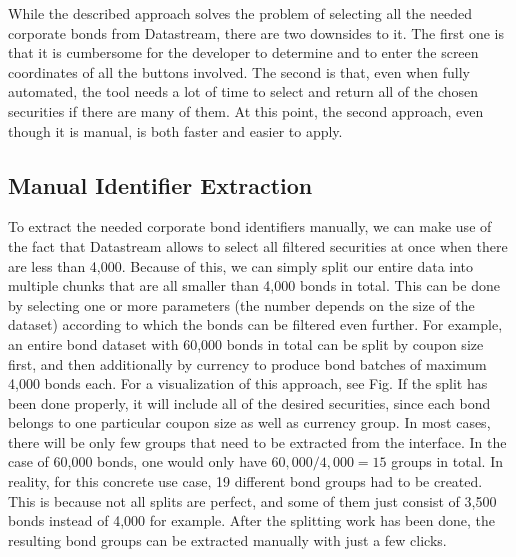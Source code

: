 While the described approach solves the problem of selecting all the needed corporate bonds from Datastream, there are two downsides to it. The first one is that it is cumbersome for the developer to determine and to enter the screen coordinates of all the buttons involved. The second is that, even when fully automated, the tool needs a lot of time to select and return all of the chosen securities if there are many of them. At this point, the second approach, even though it is manual, is both faster and easier to apply. 

\subsection{Manual Identifier Extraction}
To extract the needed corporate bond identifiers manually, we can make use of the fact that Datastream allows to select all filtered securities at once when there are less than 4,000. Because of this, we can simply split our entire data into multiple chunks that are all smaller than 4,000 bonds in total. This can be done by selecting one or more parameters (the number depends on the size of the dataset) according to which the bonds can be filtered even further. For example, an entire bond dataset with 60,000 bonds in total can be split by coupon size first, and then additionally by currency to produce bond batches of maximum 4,000 bonds each. For a visualization of this approach, see Fig. %
If the split has been done properly, it will include all of the desired securities, since each bond belongs to one particular coupon size as well as currency group. In most cases, there will be only few groups that need to be extracted from the interface. In the case of 60,000 bonds, one would only have $60,000 / 4,000 = 15$ groups in total. In reality, for this concrete use case, 19 different bond groups had to be created. This is because not all splits are perfect, and some of them just consist of 3,500 bonds instead of 4,000 for example. After the splitting work has been done, the resulting bond groups can be extracted manually with just a few clicks. 









